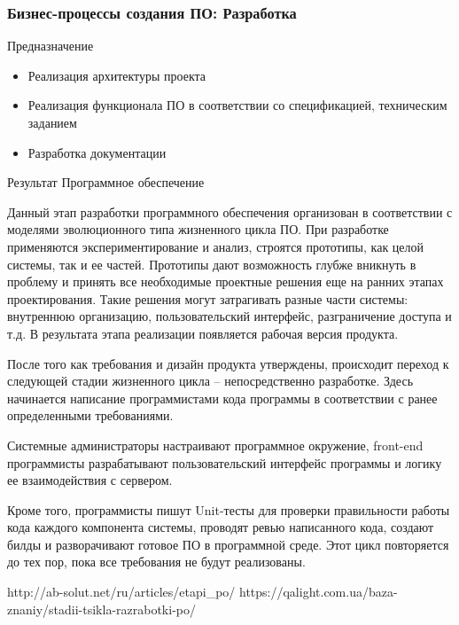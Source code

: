 \documentclass{../industrial-development}
\begin{document}
\begin{frame} \frametitle{Бизнес-процессы создания ПО: Разработка}
	\begin{block}{Предназначение}
		\begin{itemize}
			\item Реализация архитектуры проекта
			\item Реализация функционала ПО в соответствии со спецификацией, техническим заданием
			\item Разработка документации
		\end{itemize}
	\end{block}
	\begin{block}{Результат}
		Программное обеспечение
	\end{block}
\end{frame}
\lecturenotes
Данный этап разработки программного обеспечения организован в соответствии с моделями эволюционного типа жизненного цикла ПО. При разработке применяются экспериментирование и анализ, строятся прототипы, как целой системы, так и ее частей. Прототипы дают возможность глубже вникнуть в проблему и принять все необходимые проектные решения еще на ранних этапах проектирования. Такие решения могут затрагивать разные части системы: внутреннюю организацию, пользовательский интерфейс, разграничение доступа и т.д. В результата этапа реализации появляется рабочая версия продукта.

После того как требования и дизайн продукта утверждены, происходит переход к следующей стадии жизненного цикла – непосредственно разработке. Здесь начинается написание программистами кода программы в соответствии с ранее определенными требованиями.

Системные администраторы настраивают программное окружение, front-end программисты разрабатывают пользовательский интерфейс программы и логику ее взаимодействия с сервером.

Кроме того, программисты пишут Unit-тесты для проверки правильности работы кода каждого компонента системы, проводят ревью написанного кода, создают билды и разворачивают готовое ПО в программной среде. Этот цикл повторяется до тех пор, пока все требования не будут реализованы.

http://ab-solut.net/ru/articles/etapi_po/
https://qalight.com.ua/baza-znaniy/stadii-tsikla-razrabotki-po/
\end{document}
